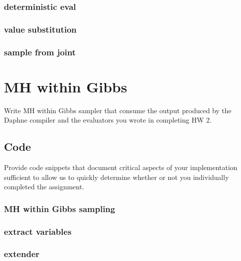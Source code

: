 \documentclass{article}
\def\blu#1{{\color{blu}#1}}
\begin{document}
\subsubsection{deterministic eval}

\pagebreak
\subsubsection{value substitution}

\subsubsection{sample from joint}

\pagebreak
\section{MH within Gibbs}

\blu{Write MH within Gibbs sampler that consume the output produced by the Daphne compiler and the evaluators you wrote in completing HW 2. }

\subsection{Code}
\blu{Provide code snippets that document critical aspects of your implementation sufficient to allow us to quickly determine whether or not you individually completed the assignment.}
\subsubsection{MH within Gibbs sampling}

\subsubsection{extract variables}

\subsubsection{extender}

\end{document}
